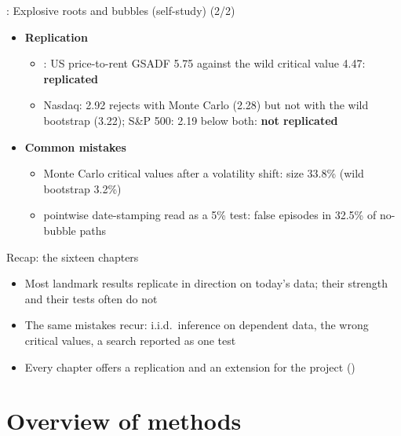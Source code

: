 \begin{frame}{: Explosive roots and bubbles (self-study) (2/2)}
\itemsize{\small}
\begin{itemize}
    \item \textbf{Replication}
    \begin{itemize}
        \item {}: US price-to-rent GSADF 5.75 against the wild critical value 4.47: \textbf{replicated}
        \item {} Nasdaq: 2.92 rejects with Monte Carlo (2.28) but not with the wild bootstrap (3.22);  S\&P 500: 2.19 below both: \textbf{not replicated}
    \end{itemize}
    \item \textbf{Common mistakes}
    \begin{itemize}
        \item Monte Carlo critical values after a volatility shift: size 33.8\% (wild bootstrap 3.2\%)
        \item pointwise date-stamping read as a 5\% test: false episodes in 32.5\% of no-bubble paths
    \end{itemize}
\end{itemize}
\end{frame}

\begin{frame}{Recap: the sixteen chapters}
\itemsize{\small}
\begin{itemize}
    \item Most landmark results replicate in direction on today's data; their strength and their tests often do not
    \item The same mistakes recur: i.i.d.\ inference on dependent data, the wrong critical values, a search reported as one test
    \item Every chapter offers a replication and an extension for the project ()
\end{itemize}
\end{frame}


\section{Overview of methods}

